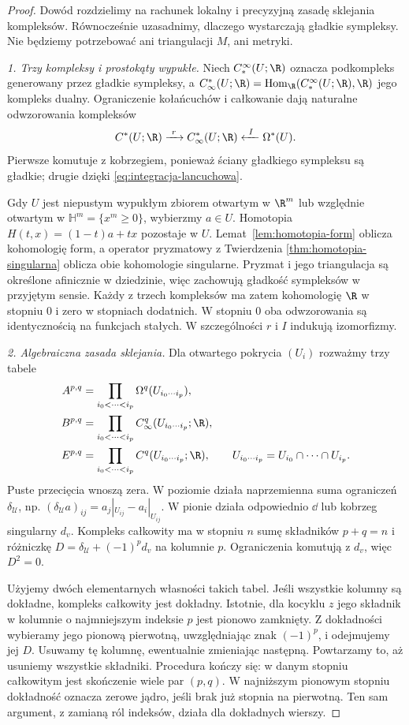 \begin{proof}
Dowód rozdzielimy na rachunek lokalny i precyzyjną
zasadę sklejania kompleksów. Równocześnie uzasadnimy,
dlaczego wystarczają gładkie sympleksy. Nie będziemy
potrzebować ani triangulacji $M$, ani metryki.

\emph{1. Trzy kompleksy i prostokąty wypukłe.}
Niech $C_*^\infty(U;\R)$ oznacza podkompleks
generowany przez gładkie sympleksy, a
$C_\infty^*(U;\R)=\operatorname{Hom}_{\R}
(C_*^\infty(U;\R),\R)$ jego kompleks dualny.
Ograniczenie kołańcuchów i całkowanie dają naturalne
odwzorowania kompleksów
\[
 C^*(U;\R)\xrightarrow{\ r\ }C_\infty^*(U;\R)
 \xleftarrow{\ I\ }\Omega^*(U).
\]
Pierwsze komutuje z kobrzegiem, ponieważ ściany
gładkiego sympleksu są gładkie; drugie dzięki
\eqref{eq:integracja-lancuchowa}.

Gdy $U$ jest niepustym wypukłym zbiorem otwartym
w $\R^m$ lub względnie otwartym w
$\mathbb H^m=\{x^m\geq0\}$, wybierzmy $a\in U$.
Homotopia $H(t,x)=(1-t)a+tx$ pozostaje w $U$.
Lemat~\ref{lem:homotopia-form} oblicza kohomologię
form, a operator pryzmatowy z Twierdzenia
\ref{thm:homotopia-singularna} oblicza obie kohomologie
singularne. Pryzmat i jego triangulacja są określone
afinicznie w dziedzinie, więc zachowują gładkość
sympleksów w przyjętym sensie. Każdy z trzech
kompleksów ma zatem kohomologię $\R$ w stopniu $0$
i zero w stopniach dodatnich. W stopniu $0$ oba
odwzorowania są identycznością na funkcjach stałych.
W szczególności $r$ i $I$ indukują izomorfizmy.

\emph{2. Algebraiczna zasada sklejania.}
Dla otwartego pokrycia $(U_i)$ rozważmy trzy tabele
\[
 \begin{aligned}
 A^{p,q}&=\prod_{i_0<\cdots<i_p}\Omega^q(U_{i_0\cdots i_p}),\\
 B^{p,q}&=\prod_{i_0<\cdots<i_p}C_\infty^q(U_{i_0\cdots i_p};\R),\\
 E^{p,q}&=\prod_{i_0<\cdots<i_p}C^q(U_{i_0\cdots i_p};\R),
 \qquad U_{i_0\cdots i_p}=U_{i_0}\cap\cdots\cap U_{i_p}.
 \end{aligned}
\]
Puste przecięcia wnoszą zera. W poziomie działa
naprzemienna suma ograniczeń $\delta_{\mathcal U}$,
np. $(\delta_{\mathcal U}a)_{ij}=a_j|_{U_{ij}}-a_i|_{U_{ij}}$.
W pionie działa odpowiednio $\dd$ lub kobrzeg singularny
$d_v$. Kompleks całkowity ma w stopniu $n$ sumę
składników $p+q=n$ i różniczkę
$D=\delta_{\mathcal U}+(-1)^p d_v$ na kolumnie $p$.
Ograniczenia komutują z $d_v$, więc $D^2=0$.

Użyjemy dwóch elementarnych własności takich tabel.
Jeśli wszystkie kolumny są dokładne, kompleks całkowity
jest dokładny. Istotnie, dla kocyklu $z$ jego składnik
w kolumnie o najmniejszym indeksie $p$ jest pionowo
zamknięty. Z dokładności wybieramy jego pionową pierwotną,
uwzględniając znak $(-1)^p$, i odejmujemy jej $D$.
Usuwamy tę kolumnę, ewentualnie zmieniając następną.
Powtarzamy to, aż usuniemy wszystkie składniki.
Procedura kończy się: w danym stopniu całkowitym jest
skończenie wiele par $(p,q)$. W najniższym pionowym
stopniu dokładność oznacza zerowe jądro, jeśli brak
już stopnia na pierwotną. Ten sam argument, z zamianą
ról indeksów, działa dla dokładnych wierszy.


\end{proof}
